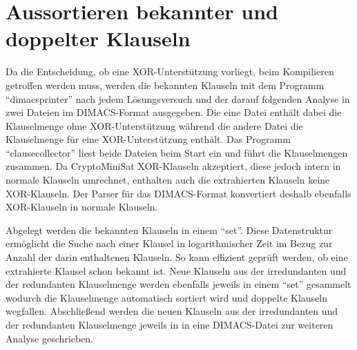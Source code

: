 \section{Aussortieren bekannter und doppelter Klauseln}
\label{sec:ana:rem_double}

Da die Entscheidung, ob eine XOR-Unterstützung vorliegt, beim Kompilieren getroffen werden muss, werden die bekannten Klauseln
mit dem Programm "`dimacsprinter"' nach jedem Lösungsversuch und der darauf folgenden Analyse in zwei Dateien im DIMACS-Format
ausgegeben. Die eine Datei enthält dabei die Klauselmenge ohne XOR-Unterstützung während die andere Datei die Klauselmenge für
eine XOR-Unterstützung enthält. Das Programm "`clausecollector"' liest beide Dateien beim Start ein und führt die Klauselmengen
zusammen. Da CryptoMiniSat XOR-Klauseln akzeptiert, diese jedoch intern in normale Klauseln umrechnet, enthalten auch die
extrahierten Klauseln keine XOR-Klauseln. Der Parser für das DIMACS-Format konvertiert deshalb ebenfalls XOR-Klauseln in normale
Klauseln.

Abgelegt werden die bekannten Klauseln in einem "`set"'. Diese Datenstruktur ermöglicht die Suche nach einer Klausel in logarithmischer
Zeit im Bezug zur Anzahl der darin enthaltenen Klauseln. So kann effizient geprüft werden, ob eine extrahierte Klausel schon bekannt ist.
Neue Klauseln aus der irredundanten und der redundanten Klauselmenge werden ebenfalls jeweils in einem "`set"' gesammelt wodurch die
Klauselmenge automatisch sortiert wird und doppelte Klauseln wegfallen. Abschließend werden die neuen Klauseln aus der irredundanten und
der redundanten Klauselmenge jeweils in in eine DIMACS-Datei zur weiteren Analyse geschrieben.